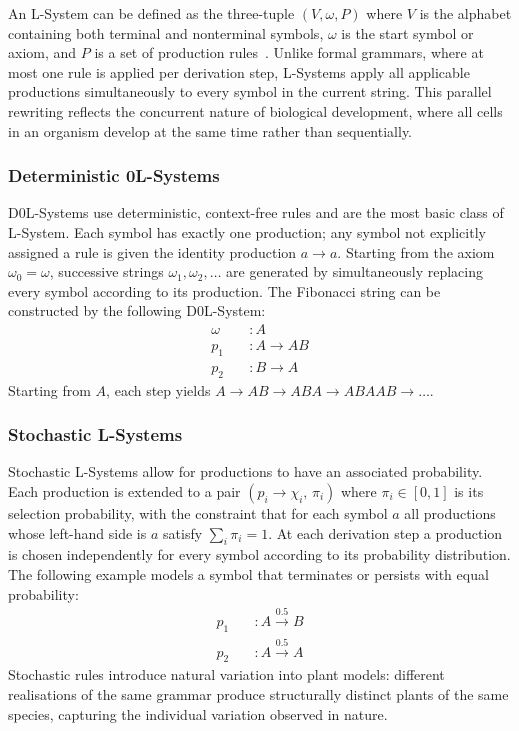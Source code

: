 An L-System can be defined as the three-tuple $(V, \omega, P)$ where $V$ is the alphabet containing both
terminal and nonterminal symbols, $\omega$ is the start symbol or axiom, and $P$ is a set of production
rules~\cite{kariSystems1997}. Unlike formal grammars, where at most one rule is applied per derivation step,
L-Systems apply all applicable productions simultaneously to every symbol in the current string. This
parallel rewriting reflects the concurrent nature of biological development, where all cells in an organism
develop at the same time rather than sequentially.

\subsubsection{Deterministic 0L-Systems}

D0L-Systems use deterministic, context-free rules and are the most basic class of L-System. Each symbol has
exactly one production; any symbol not explicitly assigned a rule is given the identity production $a
\rightarrow a$. Starting from the axiom $\omega_0 = \omega$, successive strings $\omega_1, \omega_2, \ldots$
are generated by simultaneously replacing every symbol according to its production. The Fibonacci string can
be constructed by the following D0L-System:
\begin{align*}
  \omega \quad &: A \\
  p_1    \quad &: A \rightarrow AB \\
  p_2    \quad &: B \rightarrow A
\end{align*}
Starting from $A$, each step yields $A \rightarrow AB \rightarrow ABA \rightarrow ABAAB \rightarrow \dots$.

\subsubsection{Stochastic L-Systems}

Stochastic L-Systems allow for productions to have an associated probability. Each production is extended to
a pair $(p_i \rightarrow \chi_i,\, \pi_i)$ where $\pi_i \in [0, 1]$ is its selection probability, with the
constraint that for each symbol $a$ all productions whose left-hand side is $a$ satisfy $\sum_i \pi_i = 1$.
At each derivation step a production is chosen independently for every symbol according to its probability
distribution. The following example models a symbol that terminates or persists with equal probability:
\begin{align*}
  p_1 \quad &: A \xrightarrow{0.5} B \\
  p_2 \quad &: A \xrightarrow{0.5} A
\end{align*}
Stochastic rules introduce natural variation into plant models: different realisations of the same grammar
produce structurally distinct plants of the same species, capturing the individual variation observed in nature.

